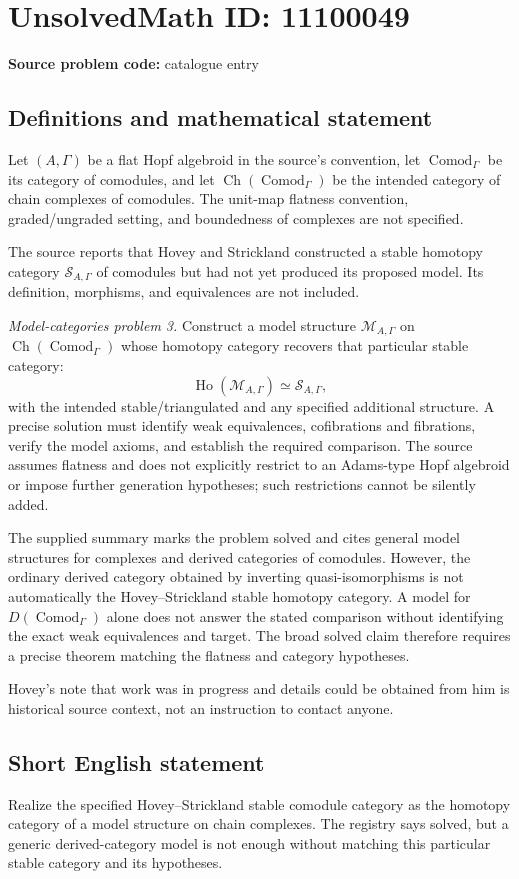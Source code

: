 \documentclass[11pt]{article}
\begin{document}
\section*{UnsolvedMath ID: 11100049}
\textbf{Source problem code:} catalogue entry
\subsection{Definitions and mathematical statement}
Let \((A,\Gamma)\) be a flat Hopf algebroid in the source's convention, let \(\operatorname{Comod}_\Gamma\) be its category of comodules, and let \(\operatorname{Ch}(\operatorname{Comod}_\Gamma)\) be the intended category of chain complexes of comodules. The unit-map flatness convention, graded/ungraded setting, and boundedness of complexes are not specified.

The source reports that Hovey and Strickland constructed a stable homotopy category \(\mathcal S_{A,\Gamma}\) of comodules but had not yet produced its proposed model. Its definition, morphisms, and equivalences are not included.

\emph{Model-categories problem 3.} Construct a model structure \(\mathcal M_{A,\Gamma}\) on \(\operatorname{Ch}(\operatorname{Comod}_\Gamma)\) whose homotopy category recovers that particular stable category:
\[
 \operatorname{Ho}(\mathcal M_{A,\Gamma})\simeq\mathcal S_{A,\Gamma},
\]
with the intended stable/triangulated and any specified additional structure. A precise solution must identify weak equivalences, cofibrations and fibrations, verify the model axioms, and establish the required comparison. The source assumes flatness and does not explicitly restrict to an Adams-type Hopf algebroid or impose further generation hypotheses; such restrictions cannot be silently added.

The supplied summary marks the problem solved and cites general model structures for complexes and derived categories of comodules. However, the ordinary derived category obtained by inverting quasi-isomorphisms is not automatically the Hovey--Strickland stable homotopy category. A model for \(D(\operatorname{Comod}_\Gamma)\) alone does not answer the stated comparison without identifying the exact weak equivalences and target. The broad solved claim therefore requires a precise theorem matching the flatness and category hypotheses.

Hovey's note that work was in progress and details could be obtained from him is historical source context, not an instruction to contact anyone.
\subsection{Short English statement}
Realize the specified Hovey--Strickland stable comodule category as the homotopy category of a model structure on chain complexes. The registry says solved, but a generic derived-category model is not enough without matching this particular stable category and its hypotheses.
\end{document}
